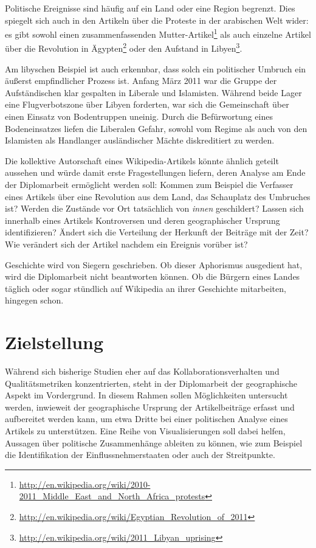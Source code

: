 Politische Ereignisse sind häufig auf ein Land oder eine Region begrenzt.
Dies spiegelt sich auch in den Artikeln über die Proteste in der arabischen Welt wider: es gibt sowohl einen zusammenfassenden \glqq Mutter-Artikel\grqq\footnote{\url{http://en.wikipedia.org/wiki/2010-2011_Middle_East_and_North_Africa_protests}} als auch einzelne Artikel über die Revolution in Ägypten\footnote{\url{http://en.wikipedia.org/wiki/Egyptian_Revolution_of_2011}} oder den Aufstand in Libyen\footnote{\url{http://en.wikipedia.org/wiki/2011_Libyan_uprising}}.

Am libyschen Beispiel ist auch erkennbar, dass solch ein politischer Umbruch ein äußerst empfindlicher Prozess ist.
Anfang März 2011 war die Gruppe der Aufständischen klar gespalten in Liberale und Islamisten.
Während beide Lager eine Flugverbotszone über Libyen forderten, war sich die Gemeinschaft über einen Einsatz von Bodentruppen uneinig.
Durch die Befürwortung eines Bodeneinsatzes liefen die Liberalen Gefahr, sowohl vom Regime als auch von den Islamisten als Handlanger ausländischer Mächte diskreditiert zu werden.\cite{econ18290470}

Die kollektive Autorschaft eines Wikipedia-Artikels könnte ähnlich geteilt aussehen und würde damit erste Fragestellungen liefern, deren Analyse am Ende der Diplomarbeit ermöglicht werden soll:
Kommen zum Beispiel die Verfasser eines Artikels über eine Revolution aus dem Land, das Schauplatz des Umbruches ist? 
Werden die Zustände vor Ort tatsächlich von \emph{innen} geschildert?
Lassen sich innerhalb eines Artikels Kontroversen und deren geographischer Ursprung identifizieren?
Ändert sich die Verteilung der Herkunft der Beiträge mit der Zeit? 
Wie verändert sich der Artikel nachdem ein Ereignis vorüber ist?

Geschichte wird von Siegern geschrieben. 
Ob dieser Aphorismus ausgedient hat, wird die Diplomarbeit nicht beantworten können.
Ob die Bürgern eines Landes täglich oder sogar stündlich auf Wikipedia an ihrer Geschichte mitarbeiten, hingegen schon.


\section{Zielstellung}

Während sich bisherige Studien eher auf das Kollaborationsverhalten und Qualitätsmetriken konzentrierten, steht in der Diplomarbeit der geographische Aspekt im Vordergrund.
In diesem Rahmen sollen Möglichkeiten untersucht werden, inwieweit der geographische Ursprung der Artikelbeiträge erfasst und aufbereitet werden kann, um etwa Dritte bei einer politischen Analyse eines Artikels zu unterstützen.
Eine Reihe von Visualisierungen soll dabei helfen, Aussagen über politische Zusammenhänge ableiten zu können, wie zum Beispiel die Identifikation der Einflussnehmerstaaten oder auch der Streitpunkte. 

